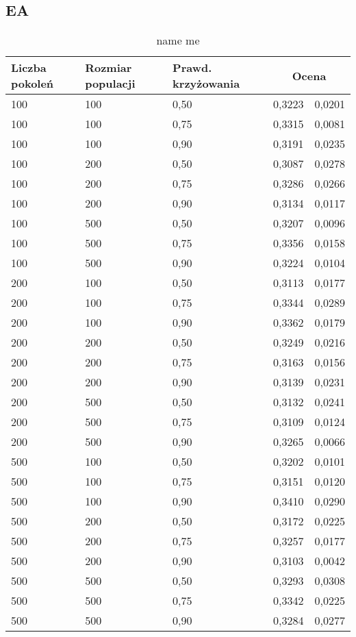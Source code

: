 \documentclass[11pt,a4paper,oneside]{report}
\begin{document}
\subsection{EA}

\begin{center}
	\begin{longtable}{|l|l|l|r@{$\pm$}r|}
		\caption{name me}\\
		\hline
		Liczba pokoleń & Rozmiar populacji & Prawd. krzyżowania & \multicolumn{2}{|c|}{Ocena}\\ \hline \hline\endhead
		100 & 100 & 0,50 & 0,3223 & 0,0201\\ \hline
		100 & 100 & 0,75 & 0,3315 & 0,0081\\ \hline
		100 & 100 & 0,90 & 0,3191 & 0,0235\\ \hline
		100 & 200 & 0,50 & 0,3087 & 0,0278\\ \hline
		100 & 200 & 0,75 & 0,3286 & 0,0266\\ \hline
		100 & 200 & 0,90 & 0,3134 & 0,0117\\ \hline
		100 & 500 & 0,50 & 0,3207 & 0,0096\\ \hline
		100 & 500 & 0,75 & 0,3356 & 0,0158\\ \hline
		100 & 500 & 0,90 & 0,3224 & 0,0104\\ \hline
		200 & 100 & 0,50 & 0,3113 & 0,0177\\ \hline
		200 & 100 & 0,75 & 0,3344 & 0,0289\\ \hline
		200 & 100 & 0,90 & 0,3362 & 0,0179\\ \hline
		200 & 200 & 0,50 & 0,3249 & 0,0216\\ \hline
		200 & 200 & 0,75 & 0,3163 & 0,0156\\ \hline
		200 & 200 & 0,90 & 0,3139 & 0,0231\\ \hline
		200 & 500 & 0,50 & 0,3132 & 0,0241\\ \hline
		200 & 500 & 0,75 & 0,3109 & 0,0124\\ \hline
		200 & 500 & 0,90 & 0,3265 & 0,0066\\ \hline
		500 & 100 & 0,50 & 0,3202 & 0,0101\\ \hline
		500 & 100 & 0,75 & 0,3151 & 0,0120\\ \hline
		500 & 100 & 0,90 & 0,3410 & 0,0290\\ \hline
		500 & 200 & 0,50 & 0,3172 & 0,0225\\ \hline
		500 & 200 & 0,75 & 0,3257 & 0,0177\\ \hline
		500 & 200 & 0,90 & 0,3103 & 0,0042\\ \hline
		500 & 500 & 0,50 & 0,3293 & 0,0308\\ \hline
		500 & 500 & 0,75 & 0,3342 & 0,0225\\ \hline
		500 & 500 & 0,90 & 0,3284 & 0,0277\\ \hline
	\end{longtable}
\end{center}
\end{document}
